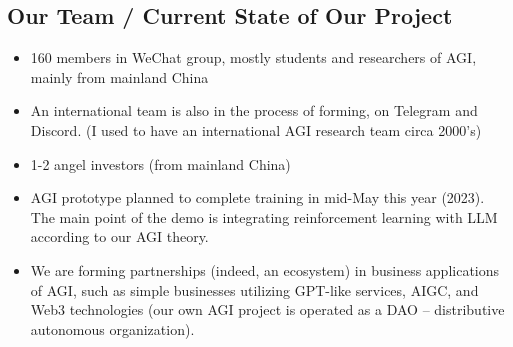\begin{preview}
\begin{minipage}{\textwidth}
	\setlength{\parskip}{0.4\baselineskip}

\section{Our Team / Current State of Our Project}

\begin{itemize}
	\item 160 members in WeChat group, mostly students and researchers of AGI, mainly from mainland China

	\item An international team is also in the process of forming, on Telegram and Discord. (I used to have an international AGI research team circa 2000's)
	
	\item 1-2 angel investors (from mainland China)

	\item AGI prototype planned to complete training in mid-May this year (2023).  The main point of the demo is integrating reinforcement learning with LLM according to our AGI theory.

	\item We are forming partnerships (indeed, an ecosystem) in business applications of AGI, such as simple businesses utilizing GPT-like services, AIGC, and Web3 technologies (our own AGI project is operated as a DAO -- distributive autonomous organization).

\end{itemize}

\end{minipage}
\end{preview}


